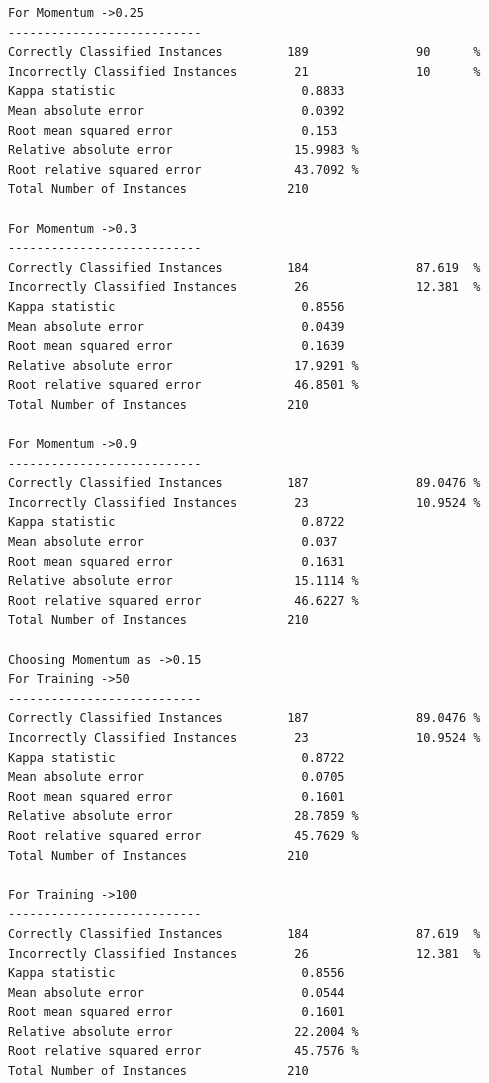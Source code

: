 \documentclass[fontsize=10pt,DIV=14]{scrartcl}
\begin{document}
\begin{itemize}
\begin{verbatim}
For Momentum ->0.25 
---------------------------
Correctly Classified Instances         189               90      %
Incorrectly Classified Instances        21               10      %
Kappa statistic                          0.8833
Mean absolute error                      0.0392
Root mean squared error                  0.153 
Relative absolute error                 15.9983 %
Root relative squared error             43.7092 %
Total Number of Instances              210     

For Momentum ->0.3 
---------------------------
Correctly Classified Instances         184               87.619  %
Incorrectly Classified Instances        26               12.381  %
Kappa statistic                          0.8556
Mean absolute error                      0.0439
Root mean squared error                  0.1639
Relative absolute error                 17.9291 %
Root relative squared error             46.8501 %
Total Number of Instances              210     

For Momentum ->0.9 
---------------------------
Correctly Classified Instances         187               89.0476 %
Incorrectly Classified Instances        23               10.9524 %
Kappa statistic                          0.8722
Mean absolute error                      0.037 
Root mean squared error                  0.1631
Relative absolute error                 15.1114 %
Root relative squared error             46.6227 %
Total Number of Instances              210     

Choosing Momentum as ->0.15
For Training ->50 
---------------------------
Correctly Classified Instances         187               89.0476 %
Incorrectly Classified Instances        23               10.9524 %
Kappa statistic                          0.8722
Mean absolute error                      0.0705
Root mean squared error                  0.1601
Relative absolute error                 28.7859 %
Root relative squared error             45.7629 %
Total Number of Instances              210     

For Training ->100 
---------------------------
Correctly Classified Instances         184               87.619  %
Incorrectly Classified Instances        26               12.381  %
Kappa statistic                          0.8556
Mean absolute error                      0.0544
Root mean squared error                  0.1601
Relative absolute error                 22.2004 %
Root relative squared error             45.7576 %
Total Number of Instances              210     


\end{verbatim}
\end{itemize}
\end{document}
